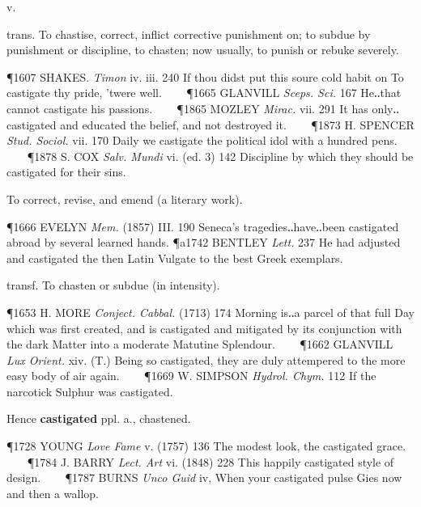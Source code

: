 \begin{description}[wide, labelwidth=!, labelindent=0pt]
 v.

\noindent {}

\vspace{-0.3cm}

\begin{myenumerate}

 trans. To chastise, correct, inflict corrective punishment on; to subdue by punishment or discipline, to chasten; now usually, to punish or rebuke severely.

\P 1607 SHAKES.  \textit{Timon} iv. iii. 240 If thou didst put this soure cold habit on To castigate thy pride, 'twere well.    
\P 1665 GLANVILL  \textit{Sceps. Sci.} 167 He‥that cannot castigate his passions.    
\P 1865 MOZLEY  \textit{Mirac.} vii. 291 It has only‥castigated and educated the belief, and not destroyed it.    
\P 1873 H. SPENCER  \textit{Stud. Sociol.} vii. 170 Daily we castigate the political idol with a hundred pens.    
\P 1878 S. COX  \textit{Salv. Mundi} vi. (ed. 3) 142 Discipline by which they should be castigated for their sins.

 To correct, revise, and emend (a literary work).

\P 1666 EVELYN  \textit{Mem.} (1857) III. 190 Seneca's tragedies‥have‥been castigated abroad by several learned hands.
\P a1742 BENTLEY  \textit{Lett.} 237 He had adjusted and castigated the then Latin Vulgate to the best Greek exemplars.

 transf. To chasten or subdue (in intensity).

\P 1653 H. MORE  \textit{Conject. Cabbal.} (1713) 174 Morning is‥a parcel of that full Day which was first created, and is castigated and mitigated by its conjunction with the dark Matter into a moderate Matutine Splendour.    
\P 1662 GLANVILL  \textit{Lux Orient.} xiv. (T.) Being so castigated, they are duly attempered to the more easy body of air again.    
\P 1669 W. SIMPSON  \textit{Hydrol. Chym.} 112 If the narcotick Sulphur was castigated.

\noindent
Hence \textbf{castigated} ppl. a., chastened.

\P 1728 YOUNG  \textit{Love Fame} v. (1757) 136 The modest look, the castigated grace.    
\P 1784 J. BARRY  \textit{Lect. Art} vi. (1848) 228 This happily castigated style of design.    
\P 1787 BURNS  \textit{Unco Guid} iv, When your castigated pulse Gies now and then a wallop.
\end{myenumerate}



\end{description}
